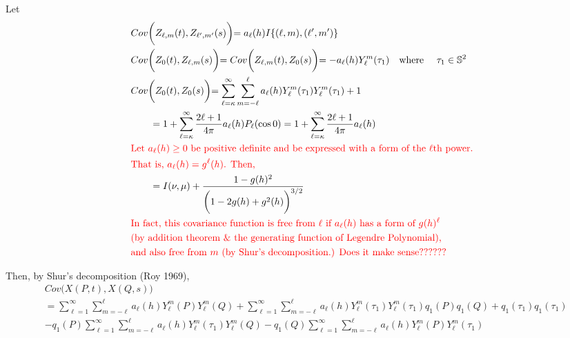\documentclass[11pt]{article}
\begin{document}
\begin{itemize}
Let\\
\begin{align*}
&Cov\biggl( Z_{\ell,m}(t), Z_{\ell',m'}(s) \biggl) = a_{\ell}(h) I\{(\ell,m),(\ell',m')\}\\
&Cov\biggl( Z_{0}(t), Z_{\ell,m}(s) \biggl) = Cov\biggl( Z_{\ell,m}(t), Z_{0}(s) \biggl) = -a_{\ell}(h) Y_{\ell}^{m}(\tau_{1}) \quad \text{where } \quad \tau_{1} \in \mathbb{S}^2\\
&Cov\biggl( Z_{0}(t), Z_{0}(s) \biggl) = \sum_{\ell=\kappa}^{\infty} \sum_{m=-\ell}^{\ell} a_{\ell}(h) Y_{\ell}^{m}(\tau_{1}) Y_{\ell}^{m}(\tau_{1}) + 1\\
&\quad \quad = 1 + \sum_{\ell=\kappa}^{\infty} \frac{2\ell +1}{4\pi} a_{\ell}(h)  P_{\ell}(\cos{0}) = 1 + \sum_{\ell=\kappa}^{\infty} \frac{2\ell +1}{4\pi} a_{\ell}(h)\\
&\text{{\color{red} Let $a_{\ell}(h) \ge 0$ be positive definite and be expressed with a form of the $\ell$th power.}}\\
&\text{{\color{red} That is, $a_{\ell}(h) = g^{\ell}(h)$. Then, }}\\
& \quad \quad = I(\nu,\mu) + \frac{1-g(h)^2}{\biggl(1-2 g(h) + g^2(h)\biggl)^{3/2}}\\
&\text{\color{red} In fact, this covariance function is free from $\ell$ if $a_{\ell}(h)$ has a form of $g(h)^{\ell}$}\\
&\text{\color{red} (by addition theorem \& the generating function of Legendre Polynomial), }\\
&\text{\color{red} and also free from $m$ (by Shur's decomposition.) Does it make sense??????}\\
\end{align*}

Then, by Shur's decomposition (Roy 1969),\\
\begin{align*}
&Cov\biggl(X(P,t), X(Q,s)\biggl)\\
&= \sum_{\ell=1}^{\infty} \sum_{m=-\ell}^{\ell}  a_{\ell}(h) Y_{\ell}^{m}(P) Y_{\ell}^{m}(Q) + \sum_{\ell=1}^{\infty} \sum_{m=-\ell}^{\ell} a_{\ell}(h) Y_{\ell}^{m}(\tau_1) Y_{\ell}^{m}(\tau_1) q_1(P) q_1(Q) + q_1(\tau_1) q_1(\tau_1)\\
&- q_1(P) \sum_{\ell=1}^{\infty} \sum_{m=-\ell}^{\ell}  a_{\ell}(h) Y_{\ell}^{m}(\tau_1) Y_{\ell}^{m}(Q) - q_1(Q) \sum_{\ell=1}^{\infty} \sum_{m=-\ell}^{\ell}  a_{\ell}(h) Y_{\ell}^{m}(P) Y_{\ell}^{m}(\tau_1)\\
\end{align*}


\end{itemize}
\end{document}
